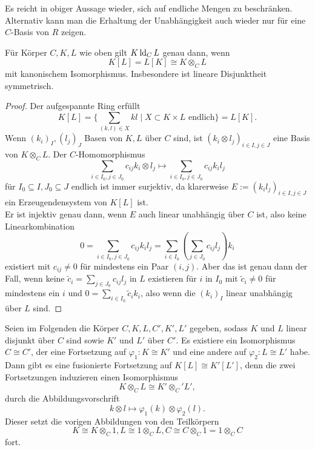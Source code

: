     \begin{remark}
    	Es reicht in obiger Aussage wieder, sich auf endliche Mengen zu beschränken. Alternativ kann man die Erhaltung der Unabhängigkeit auch wieder nur für eine $C$-Basis von $R$ zeigen.
    \end{remark}
    
    \begin{lemma}\label{Tensoren}
    	Für Körper $C,K,L$ wie oben gilt $K\operatorname{ld}_CL$ genau dann, wenn $$K[L]=L[K]\cong K\otimes_CL$$ mit kanonischem Isomorphismus. Insbesondere ist lineare Disjunktheit symmetrisch.
    \end{lemma}
    \begin{proof}
    	Der aufgespannte Ring erfüllt $$K[L]=\{\sum\limits_{(k,l)\in X}kl\mid X\subset K\times L\text{ endlich}\}=L[K].$$
    	Wenn $(k_i)_I,(l_j)_J$ Basen von $K,L$ über $C$ sind, ist $(k_i\otimes l_j)_{i\in I,j\in J}$ eine Basis von $K\otimes_CL$. Der $C$-Homomorphismus $$\sum\limits_{i\in I_0,j\in J_0} c_{ij}k_i\otimes l_j\mapsto \sum\limits_{i\in I_0,j\in J_0} c_{ij}k_il_j$$ für $I_0\subseteq I,J_0\subseteq J$ endlich ist immer surjektiv, da klarerweise $E:=(k_il_j)_{i\in I,j\in J}$ ein Erzeugendensystem von $K[L]$ ist.\\
    	Er ist injektiv genau dann, wenn $E$ auch linear unabhängig über $C$ ist, also keine Linearkombination $$0=\sum\limits_{i\in I_0,j\in J_0}c_{ij}k_il_j=\sum\limits_{i\in I_0}(\sum\limits_{j\in J_0}c_{ij}l_j)k_i$$ existiert mit $c_{ij}\neq0$ für mindestens ein Paar $(i,j)$. Aber das ist genau dann der Fall, wenn keine $\tilde{c}_i=\sum\limits_{j\in J_0}c_{ij}l_j$ in $L$ existieren für $i$ in $I_0$ mit $\tilde{c}_i\neq0$ für mindestens ein $i$ und $0=\sum\limits_{i\in I_0}\tilde{c}_ik_i$, also wenn die $(k_i)_I$ linear unabhängig über $L$ sind.
    \end{proof}
    
    \begin{corollary}\label{Isomorphismen linear disjunkt}
    	Seien im Folgenden die Körper $C,K,L,C',K',L'$ gegeben, sodass $K$ und $L$ linear disjunkt über $C$ sind sowie $K'$ und $L'$ über $C'$. Es existiere ein Isomorphismus $C\cong C'$, der eine Fortsetzung auf $\varphi_1:K\cong K'$ und eine andere auf $\varphi_2:L\cong L'$ habe. Dann gibt es eine \glqq{}fusionierte\grqq{} Fortsetzung auf $K[L]\cong K'[L']$, denn die zwei Fortsetzungen induzieren einen Isomorphismus $$K\otimes_CL\cong K'\otimes_C'L',$$ durch die Abbildungsvorschrift $$k\otimes l\mapsto\varphi_1(k)\otimes\varphi_2(l).$$ Dieser setzt die vorigen Abbildungen von den Teilkörpern $$K\cong K\otimes_C1,L\cong1\otimes_CL,C\cong C\otimes_C1=1\otimes_CC$$ fort.
    \end{corollary}
    
